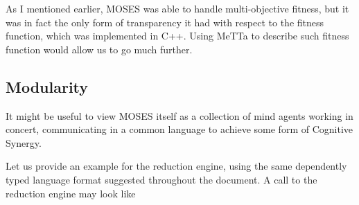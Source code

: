 \documentclass[]{report}
\begin{document}
As I mentioned earlier, MOSES was able to handle multi-objective
fitness, but it was in fact the only form of transparency it had with
respect to the fitness function, which was implemented in C++.  Using
MeTTa to describe such fitness function would allow us to go much
further.

\subsection{Modularity}

It might be useful to view MOSES itself as a collection of mind agents
working in concert, communicating in a common language to achieve some
form of Cognitive Synergy.

Let us provide an example for the reduction engine, using the same
dependently typed language format suggested throughout the document.
A call to the reduction engine may look like
\end{document}
